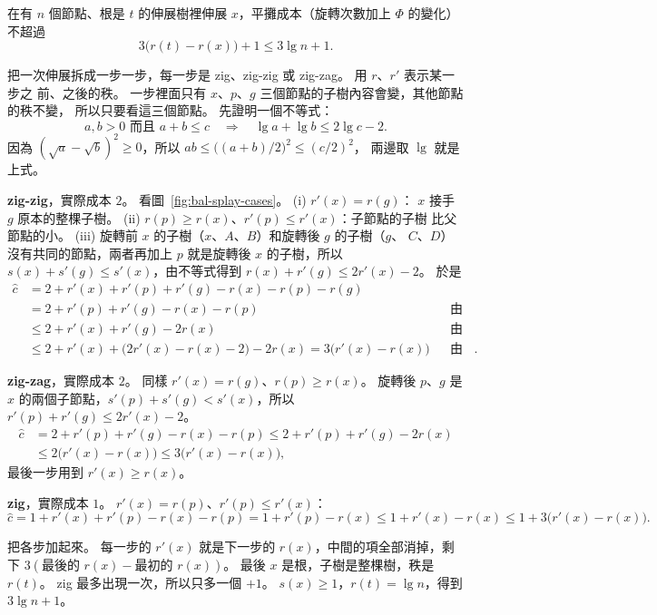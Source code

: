 \begin{lemma}[存取引理]
\label{lem:bal-splay-access}
在有 $n$ 個節點、根是 $t$ 的伸展樹裡伸展 $x$，平攤成本（旋轉次數加上 $\Phi$ 的變化）
不超過
\[
3\bigl(r(t) - r(x)\bigr) + 1 \le 3 \lg n + 1 .
\]
\end{lemma}

\begin{whybox}[存取引理]
把一次伸展拆成一步一步，每一步是 zig、zig-zig 或 zig-zag。 用 $r$、$r'$ 表示某一步之
前、之後的秩。 一步裡面只有 $x$、$p$、$g$ 三個節點的子樹內容會變，其他節點的秩不變，
所以只要看這三個節點。 先證明一個不等式：
\[
a, b > 0 \text{ 而且 } a + b \le c \quad\Longrightarrow\quad \lg a + \lg b \le 2 \lg c - 2 .
\]
因為 $(\sqrt a - \sqrt b)^2 \ge 0$，所以 $ab \le \bigl((a + b)/2\bigr)^2 \le (c/2)^2$，
兩邊取 $\lg$ 就是上式。

\textbf{zig-zig}，實際成本 $2$。 看圖~\ref{fig:bal-splay-cases}。 (i) $r'(x) = r(g)$：
$x$ 接手 $g$ 原本的整棵子樹。 (ii) $r(p) \ge r(x)$、$r'(p) \le r'(x)$：子節點的子樹
比父節點的小。 (iii) 旋轉前 $x$ 的子樹（$x$、$A$、$B$）和旋轉後 $g$ 的子樹（$g$、
$C$、$D$）沒有共同的節點，兩者再加上 $p$ 就是旋轉後 $x$ 的子樹，所以
$s(x) + s'(g) \le s'(x)$，由不等式得到 $r(x) + r'(g) \le 2r'(x) - 2$。 於是
\[
\begin{aligned}
\hat{c} &= 2 + r'(x) + r'(p) + r'(g) - r(x) - r(p) - r(g) \\
&= 2 + r'(p) + r'(g) - r(x) - r(p) && \text{由 (i)} \\
&\le 2 + r'(x) + r'(g) - 2r(x) && \text{由 (ii)} \\
&\le 2 + r'(x) + \bigl(2r'(x) - r(x) - 2\bigr) - 2r(x) = 3\bigl(r'(x) - r(x)\bigr) && \text{由 (iii)}.
\end{aligned}
\]

\textbf{zig-zag}，實際成本 $2$。 同樣 $r'(x) = r(g)$、$r(p) \ge r(x)$。 旋轉後 $p$、$g$
是 $x$ 的兩個子節點，$s'(p) + s'(g) < s'(x)$，所以 $r'(p) + r'(g) \le 2r'(x) - 2$。
\[
\begin{aligned}
\hat{c} &= 2 + r'(p) + r'(g) - r(x) - r(p) \le 2 + r'(p) + r'(g) - 2r(x) \\
&\le 2\bigl(r'(x) - r(x)\bigr) \le 3\bigl(r'(x) - r(x)\bigr),
\end{aligned}
\]
最後一步用到 $r'(x) \ge r(x)$。

\textbf{zig}，實際成本 $1$。 $r'(x) = r(p)$、$r'(p) \le r'(x)$：
\[
\hat{c} = 1 + r'(x) + r'(p) - r(x) - r(p) = 1 + r'(p) - r(x) \le 1 + r'(x) - r(x)
\le 1 + 3\bigl(r'(x) - r(x)\bigr).
\]

把各步加起來。 每一步的 $r'(x)$ 就是下一步的 $r(x)$，中間的項全部消掉，剩下
$3(\text{最後的 } r(x) - \text{最初的 } r(x))$。 最後 $x$ 是根，子樹是整棵樹，秩是
$r(t)$。 zig 最多出現一次，所以只多一個 $+1$。 $s(x) \ge 1$，$r(t) = \lg n$，得到
$3 \lg n + 1$。
\end{whybox}

